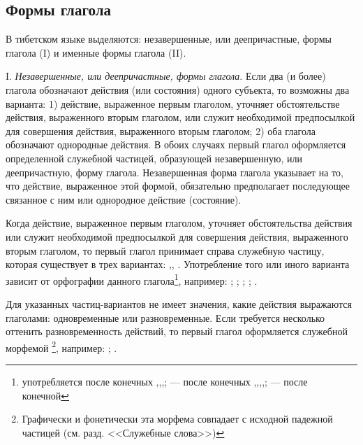 \subsection{Формы глагола}

В тибетском языке выделяются: незавершенные, или деепричастные, формы глагола (I) и именные формы глагола (II).

I. \emph{Незавершенные, или деепричастные, формы глагола}. Если два (и более) глагола обозначают действия (или состояния) одного субъекта, то возможны два варианта: 1) действие, выраженное первым глаголом, уточняет обстоятельстве действия, выраженного вторым глаголом, или служит необходимой предпосылкой для совершения действия, выраженного вторым глаголом; 2) оба глагола обозначают однородные действия. В обоих случаях первый глагол оформляется определенной служебной частицей, образующей незавершенную, или деепричастную, форму глагола. Незавершенная форма глагола указывает на то, что действие, выраженное этой формой, обязательно предполагает последующее связанное с ним или однородное действие (состояние).

Когда действие, выраженное первым глаголом, уточняет обстоятельства действия или служит необходимой предпосылкой для совершения действия, выраженного вторым глаголом, то первый глагол принимает справа служебную частицу, которая существует в трех вариантах: ,, . Употребление того или иного варианта зависит от орфографии данного глагола\footnote[36]{ употребляется после конечных ,,,;  --- после конечных ,,,,;  --- после конечной }, например:
;
;
;
;
.

Для указанных частиц-вариантов не имеет значения, какие действия выражаются глаголами: одновременные или разновременные. Если требуется несколько оттенить разновременность действий, то первый глагол оформляется служебной морфемой \footnote[37]{Графически и фонетически эта морфема совпадает с исходной падежной частицей (см. разд. <<Служебные слова>>)}, например:
;
.

